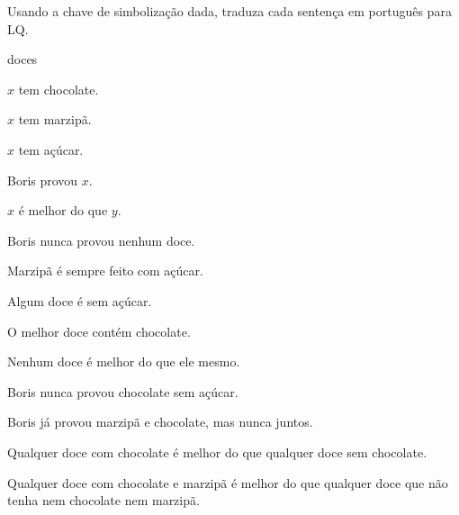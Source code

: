 \solutions
\problempart
\label{pr.QLcandies}
Usando a chave de simbolização dada, traduza cada sentença em português para LQ.
\begin{ekey}
\item[UD:] doces
\item[Cx:] $x$ tem chocolate.
\item[Mx:] $x$ tem marzipã.
\item[Sx:] $x$ tem açúcar.
\item[Tx:] Boris provou $x$.
\item[Bxy:] $x$ é melhor do que $y$.
\end{ekey}
\begin{earg}
\item Boris nunca provou nenhum doce.
\item Marzipã é sempre feito com açúcar.
\item Algum doce é sem açúcar.
\item O melhor doce contém chocolate.
\item Nenhum doce é melhor do que ele mesmo.
\item Boris nunca provou chocolate sem açúcar.
\item Boris já provou marzipã e chocolate, mas nunca juntos.
\item Qualquer doce com chocolate é melhor do que qualquer doce sem chocolate.
\item Qualquer doce com chocolate e marzipã é melhor do que qualquer doce que não tenha nem chocolate nem marzipã.
\end{earg}



